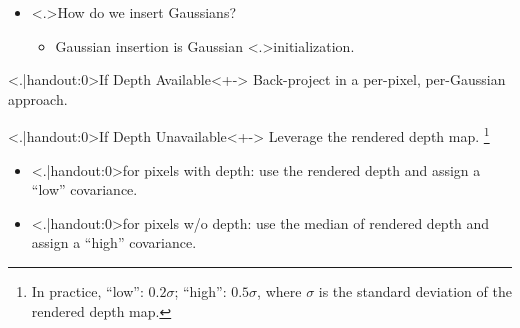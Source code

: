 \begin{frame}
	\begin{itemize}
		\item<+-> \alert<.>{How} do we insert Gaussians?
			\mode<presentation>{\vspace*{1.5ex}}
			\begin{itemize}
				\item<+-> Gaussian insertion is Gaussian \alert<.>{initialization}.
			\end{itemize}
	\end{itemize}
	\begin{block}{\alert<.|handout:0>{If Depth Available}}<+->
		Back-project in a per-pixel, per-Gaussian approach.
	\end{block}
	\begin{block}{\alert<.|handout:0>{If Depth Unavailable}}<+->
		Leverage the rendered depth map.
		\footnote{
			In practice, ``low'': \(0.2 \sigma \); ``high'': \(0.5 \sigma\), where \(\sigma\) is the standard deviation of the rendered depth map.
		}
		\mode<presentation>{\vspace*{1.5ex}}
		\begin{itemize}[<+->]
			\mode<presentation>{\setlength{\itemsep}{1.5ex}}
			\item \alert<.|handout:0>{for pixels with depth:} use the rendered depth and assign a ``low'' covariance.
			\item \alert<.|handout:0>{for pixels w/o depth:} use the median of rendered depth and assign a ``high'' covariance.
		\end{itemize}
	\end{block}
\end{frame}

